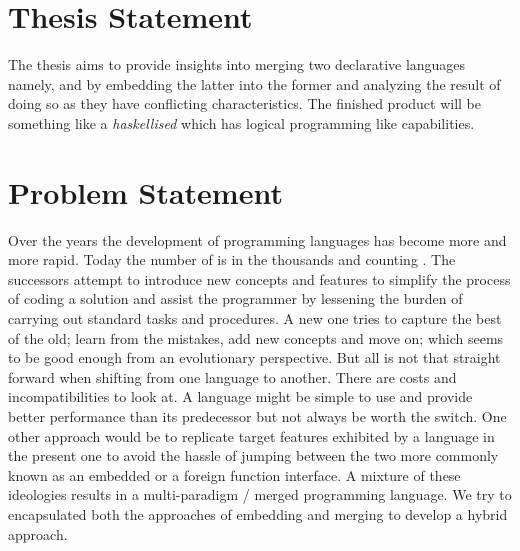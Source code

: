 \documentclass[thesis-solanki.tex]{subfiles}
\begin{document}
\section{Thesis Statement}

The thesis aims to provide insights into merging two declarative languages namely,  and
 by embedding the latter into the former and analyzing the result of doing so as they have conflicting
characteristics.
The finished product will be something like a \textit{haskellised}  which has logical programming like
capabilities.


\section{Problem Statement}

Over the years the development of programming languages has become more and more rapid.
Today the number of is in the thousands and counting \cite{website:timelineproglangwiki, website:historyofproglang}.
The successors attempt to introduce new concepts and features to simplify the process of coding a solution and assist
the programmer by lessening the burden of carrying out standard tasks and procedures.
A new one tries to capture the best of the old; learn from the mistakes, add new concepts and move on; which seems to be
good enough from an evolutionary perspective.
But all is not that straight forward when shifting from one language to another.
There are costs and incompatibilities to look at.
A language might be simple to use and provide better performance than its predecessor but not always be worth the
switch.
One other approach would be to replicate target features exhibited by a language in the present one to avoid the
hassle of jumping between the two\yyy{}{\Large,} more commonly known as an embedded or a foreign function interface.
A mixture of these ideologies results in a multi-paradigm / merged programming language.
We try to encapsulated both the approaches of embedding and merging to develop a hybrid approach.
\end{document}
